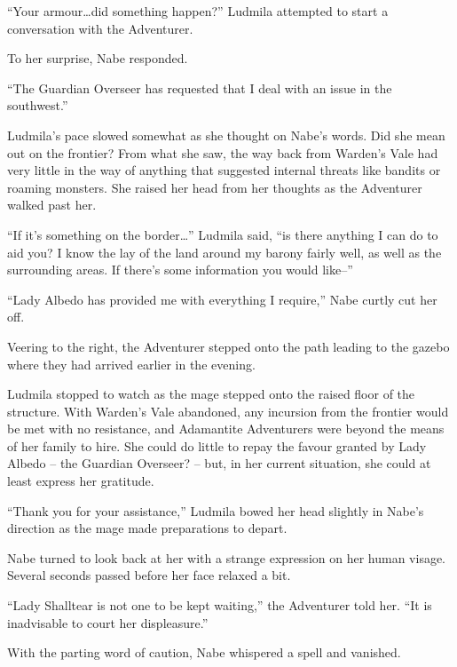  

“Your armour…did something happen?” Ludmila attempted to start a conversation with the Adventurer.

 

To her surprise, Nabe responded.

 

“The Guardian Overseer has requested that I deal with an issue in the southwest.”

 

Ludmila’s pace slowed somewhat as she thought on Nabe’s words. Did she mean out on the frontier? From what she saw, the way back from Warden’s Vale had very little in the way of anything that suggested internal threats like bandits or roaming monsters. She raised her head from her thoughts as the Adventurer walked past her.

 

“If it’s something on the border…” Ludmila said, “is there anything I can do to aid you? I know the lay of the land around my barony fairly well, as well as the surrounding areas. If there’s some information you would like–”

 

“Lady Albedo has provided me with everything I require,” Nabe curtly cut her off.

 

Veering to the right, the Adventurer stepped onto the path leading to the gazebo where they had arrived earlier in the evening.

 

Ludmila stopped to watch as the mage stepped onto the raised floor of the structure. With Warden’s Vale abandoned, any incursion from the frontier would be met with no resistance, and Adamantite Adventurers were beyond the means of her family to hire. She could do little to repay the favour granted by Lady Albedo – the Guardian Overseer? – but, in her current situation, she could at least express her gratitude.

 

“Thank you for your assistance,” Ludmila bowed her head slightly in Nabe’s direction as the mage made preparations to depart.

 

Nabe turned to look back at her with a strange expression on her human visage. Several seconds passed before her face relaxed a bit.

 

“Lady Shalltear is not one to be kept waiting,” the Adventurer told her. “It is inadvisable to court her displeasure.”

 

With the parting word of caution, Nabe whispered a spell and vanished.